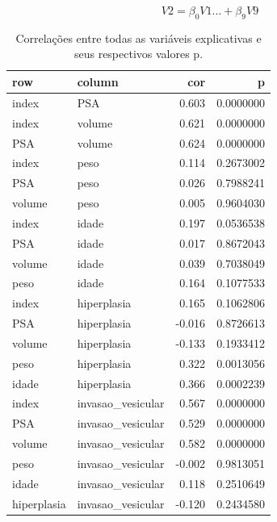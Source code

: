 \documentclass[runningheads]{llncs}\usepackage[]{graphicx}\usepackage[]{color}
\newenvironment{knitrout}{}{} %
\begin{document}
\begin{equation}
 V2 = \beta_0 V1 ... + \beta_9 V9 
\end{equation}
\begin{knitrout}
\color{fgcolor}\begin{table}

\caption{\label{tab:unnamed-chunk-13}Correlações entre todas as variáveis explicativas e seus respectivos valores p.}
\centering
\begin{tabular}[t]{llrr}
\toprule
row & column & cor & p\\
\midrule
\rowcolor{gray!6}  index & PSA & 0.603 & 0.0000000\\
index & volume & 0.621 & 0.0000000\\
\rowcolor{gray!6}  PSA & volume & 0.624 & 0.0000000\\
index & peso & 0.114 & 0.2673002\\
\rowcolor{gray!6}  PSA & peso & 0.026 & 0.7988241\\
\addlinespace
volume & peso & 0.005 & 0.9604030\\
\rowcolor{gray!6}  index & idade & 0.197 & 0.0536538\\
PSA & idade & 0.017 & 0.8672043\\
\rowcolor{gray!6}  volume & idade & 0.039 & 0.7038049\\
peso & idade & 0.164 & 0.1077533\\
\addlinespace
\rowcolor{gray!6}  index & hiperplasia & 0.165 & 0.1062806\\
PSA & hiperplasia & -0.016 & 0.8726613\\
\rowcolor{gray!6}  volume & hiperplasia & -0.133 & 0.1933412\\
peso & hiperplasia & 0.322 & 0.0013056\\
\rowcolor{gray!6}  idade & hiperplasia & 0.366 & 0.0002239\\
\addlinespace
index & invasao\_vesicular & 0.567 & 0.0000000\\
\rowcolor{gray!6}  PSA & invasao\_vesicular & 0.529 & 0.0000000\\
volume & invasao\_vesicular & 0.582 & 0.0000000\\
\rowcolor{gray!6}  peso & invasao\_vesicular & -0.002 & 0.9813051\\
idade & invasao\_vesicular & 0.118 & 0.2510649\\
\addlinespace
\rowcolor{gray!6}  hiperplasia & invasao\_vesicular & -0.120 & 0.2434580\\

\end{tabular}
\end{table}
\end{knitrout}
\end{document}
